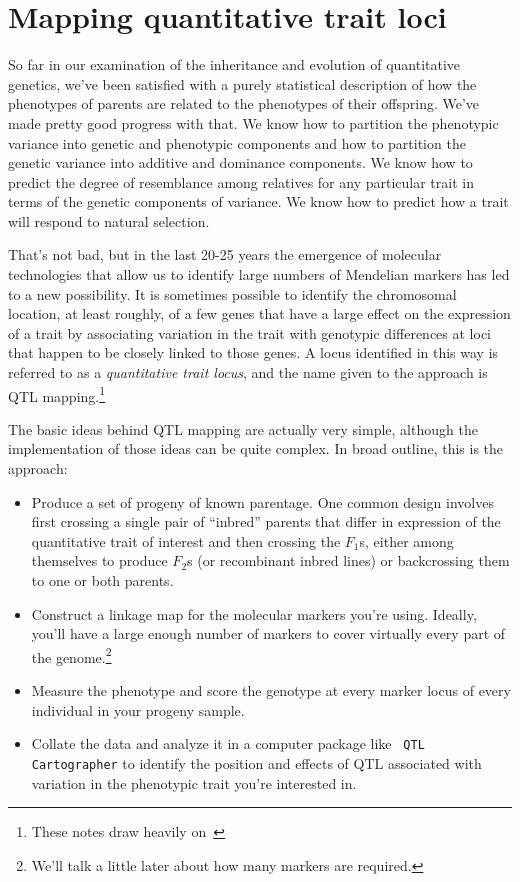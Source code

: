 \chapter{Mapping quantitative trait loci}

So far in our examination of the inheritance and evolution of
quantitative genetics, we've been satisfied with a purely statistical
description of how the phenotypes of parents are related to the
phenotypes of their offspring. We've made pretty good progress with
that. We know how to partition the phenotypic variance into genetic
and phenotypic components and how to partition the genetic variance
into additive and dominance components. We know how to predict the
degree of resemblance among relatives for any particular trait in
terms of the genetic components of variance. We know how to predict
how a trait will respond to natural selection. 

That's not bad, but in the last 20-25 years the emergence of molecular
technologies that allow us to identify large numbers of Mendelian
markers has led to a new possibility. It is sometimes possible to
identify the chromosomal location, at least roughly, of a few genes
that have a large effect on the expression of a trait by associating
variation in the trait with genotypic differences at loci that happen
to be closely linked to those genes. A locus identified in this way is
referred to as a {\it quantitative trait locus\/}, and the name given
to the approach is QTL mapping.\footnote{These notes draw heavily
  on~\cite{Lynch-Walsh-1998}}

The basic ideas behind QTL mapping are actually very simple, although
the implementation of those ideas can be quite complex. In broad
outline, this is the approach:

\begin{itemize}

\item Produce a set of progeny of known parentage. One common design
  involves first crossing a single pair of ``inbred'' parents that
  differ in expression of the quantitative trait of interest and then
  crossing the $F_1$s, either among themselves to produce $F_2$s (or
  recombinant inbred lines) or backcrossing them to one or both
  parents.

\item Construct a linkage map for the molecular markers you're
  using. Ideally, you'll have a large enough number of markers to
  cover virtually every part of the genome.\footnote{We'll talk a
    little later about how many markers are required.}

\item Measure the phenotype and score the genotype at every marker
  locus of every individual in your progeny sample.

\item Collate the data and analyze it in a computer package like {\tt
  QTL Cartographer} to identify the position and effects of QTL
  associated with variation in the phenotypic trait you're interested
  in.

\end{itemize}

